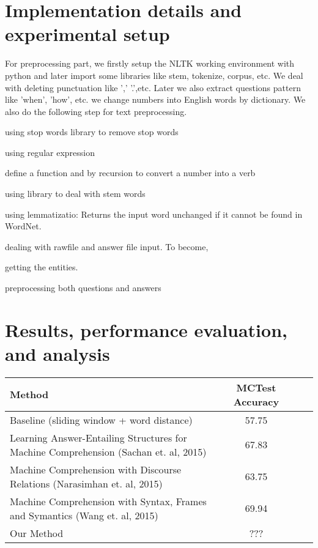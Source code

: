 \documentclass[runningheads,a4paper]{llncs}
\begin{document}
\section{Implementation details and experimental setup}
For preprocessing part, we firstly setup the NLTK working environment with python and later import some libraries like stem, tokenize, corpus, etc. We deal with deleting punctuation like ',' '.',etc. Later we also extract questions pattern like 'when', 'how', etc. we change numbers into English words by dictionary. We also do the following step for text preprocessing. 


\begin{inparaenum}
	\item using stop words library to remove stop words
	\item using regular expression
	\item define a function and by recursion to convert a number into a verb
	\item using library to deal with stem words
	\item using lemmatizatio: Returns the input word unchanged if it cannot be found in WordNet.
	\item dealing with rawfile and answer file input. To become,
	\item getting the entities.
	\item preprocessing both questions and answers
\end{inparaenum}


\section{Results, performance evaluation, and analysis}

\begin{tabular}
	{l*{2}{c}r}   	 Method  & MCTest Accuracy  \\ \hline
	Baseline (sliding window + word distance) & 57.75 \\ 
	Learning Answer-Entailing Structures for Machine Comprehension (Sachan et. al, 2015) & 67.83\\
	Machine Comprehension with Discourse Relations (Narasimhan et. al, 2015) & 63.75\\
	Machine Comprehension with Syntax, Frames and Symantics (Wang et. al, 2015) & 69.94\\
	Our Method & ???\\
	
\end{tabular}
\end{document}
